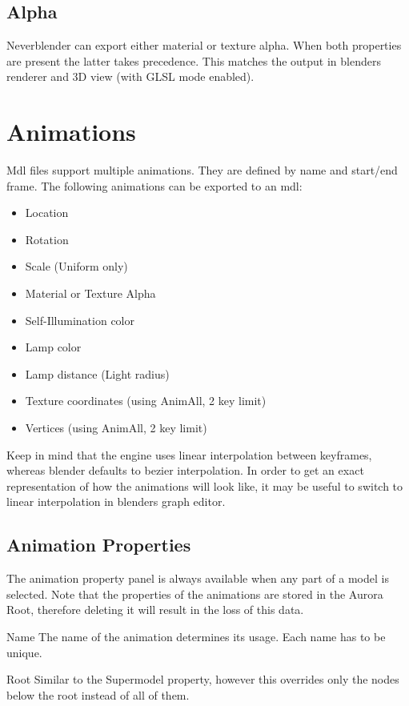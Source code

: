 \subsection*{Alpha}
Neverblender can export either material or texture alpha. When both properties are present 
the latter takes precedence. This matches the output in blenders renderer 
and 3D view (with GLSL mode enabled).

\section{Animations}
Mdl files support multiple animations. They are defined by name and start/end frame.
The following animations can be exported to an mdl:
\begin{itemize}
    \item Location
    \item Rotation
    \item Scale (Uniform only)
    \item Material or Texture Alpha
    \item Self-Illumination color
    \item Lamp color
    \item Lamp distance (Light radius)
    \item Texture coordinates (using AnimAll, 2 key limit)
    \item Vertices (using AnimAll, 2 key limit)
\end{itemize}
Keep in mind that the engine uses linear interpolation between keyframes, whereas blender 
defaults to bezier interpolation. In order to get an exact representation of how the animations will 
look like, it may be useful to switch to linear interpolation in blenders graph editor.

\subsection{Animation Properties}
The animation property panel is always available when any part of a model is selected. Note 
that the properties of the animations are stored in the Aurora Root, therefore deleting it 
will result in the loss of this data.

\begin{propertyAurora}{Name}
    The name of the animation determines its usage. Each name has to be unique.
\end{propertyAurora}

\begin{propertyAurora}{Root}
    Similar to the Supermodel property, however this overrides only the 
    nodes below the root instead of all of them.
\end{propertyAurora}

